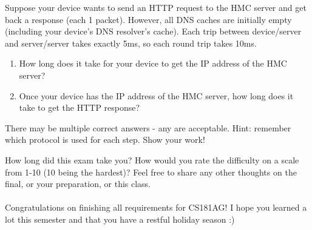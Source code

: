 \documentclass[10pt]{article}
\newenvironment{problem}[2][]{\begin{trivlist}
\item[\hskip \labelsep {\bfseries #1}\hskip \labelsep {\bfseries #2.}]}{\end{trivlist}}
\begin{document}
\begin{problem}{7: DNS lookups}
Suppose your device wants to send an HTTP request to the HMC server and get back a response (each 1 packet). However, all DNS caches are initially empty (including your device’s DNS resolver's cache). Each trip between device/server and server/server takes exactly 5ms, so each round trip takes 10ms.

\begin{enumerate}
    \item How long does it take for your device to get the IP address of the HMC server? 
    \item Once your device has the IP address of the HMC server, how long does it take to get the HTTP response?
\end{enumerate}

There may be multiple correct answers - any are acceptable. Hint: remember which protocol is used for each step. Show your work!
    
\end{problem}
\begin{problem}{8}
How long did this exam take you? How would you rate the difficulty on a scale from 1-10 (10 being the hardest)? Feel free to share any other thoughts on the final, or your preparation, or this class. \\\\
Congratulations on finishing all requirements for CS181AG! I hope you learned a lot this semester and that you have a restful holiday season :) 


\end{problem}
\end{document}

